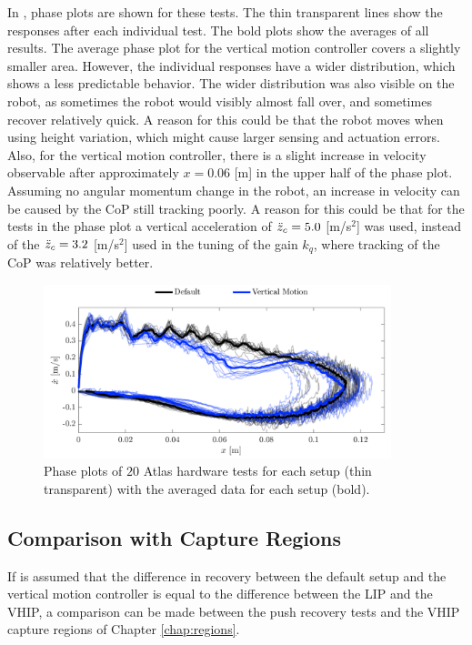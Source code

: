 In , phase plots are shown for these tests. The thin transparent lines show the responses after each individual test. The bold plots show the averages of all results. The average phase plot for the vertical motion controller covers a slightly smaller area. However, the individual responses have a wider distribution, which shows a less predictable behavior. The wider distribution was also visible on the robot, as sometimes the robot would visibly almost fall over, and sometimes recover relatively quick. A reason for this could be that the robot moves when using height variation, which might cause larger sensing and actuation errors. Also, for the vertical motion controller, there is a slight increase in velocity observable after approximately $x=0.06$ [m] in the upper half of the phase plot. Assuming no angular momentum change in the robot, an increase in velocity can be caused by the \ac{CoP} still tracking poorly. A reason for this could be that for the tests in the phase plot a vertical acceleration of $\ddot{z}_{c}=5.0$ [m/s$^2$] was used, instead of the $\ddot{z}_{c}=3.2$ [m/s$^2$] used in the tuning of the gain $k_{\dot{q}}$, where tracking of the \ac{CoP} was relatively better.

\begin{figure}
\centering
\includegraphics[width=0.9\textwidth]{STYLESTUFF/atlasphaseHW.png}
\caption{Phase plots of $20$ Atlas hardware tests for each setup (thin transparent) with the averaged data for each setup (bold).}
\label{fig:atlasphaseHW}
\end{figure}

\subsection{Comparison with Capture Regions}
If is assumed that the difference in recovery between the default setup and the vertical motion controller is equal to the difference between the LIP and the \ac{VHIP}, a comparison can be made between the push recovery tests and the \ac{VHIP} capture regions of Chapter \ref{chap:regions}.


